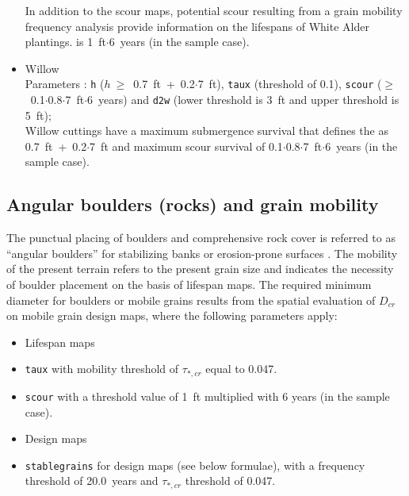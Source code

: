 \begin{itemize}
	In addition to the scour maps, potential scour resulting from a grain mobility frequency analysis provide information on the lifespans of White Alder plantings.  is 1~ft$\cdot$6~years (in the sample case).
	\item Willow\\
	Parameters \citep[extracted from][]{stromberg93, pasquale11, pasquale12, pasquale14}: \texttt{h} ($h~\geq $~0.7~ft~+~0.2$\cdot$7~ft), \texttt{taux} (threshold of 0.1), \texttt{scour} ($\geq$~0.1$\cdot$0.8$\cdot$7~ft$\cdot$6~years) and \texttt{d2w} (lower threshold is 3~ft and upper threshold is 5~ft);\\
	Willow cuttings have a maximum submergence survival that defines the  as 0.7~ft~+~0.2$\cdot$7~ft and maximum scour survival of 0.1$\cdot$0.8$\cdot$7~ft$\cdot$6~years (in the sample case).
\end{itemize}

\subsection{Angular boulders (rocks) and grain mobility}\label{sec:rocks}
The punctual placing of boulders and comprehensive rock cover is referred to as ``angular boulders'' for stabilizing banks or erosion-prone surfaces \citep[e.g.,][]{maynord08}. The mobility of the present terrain refers to the present grain size and indicates the necessity of boulder placement on the basis of lifespan maps. The required minimum diameter for boulders or mobile grains results from the spatial evaluation of $D_{cr}$ on mobile grain design maps, where the following parameters apply:
\begin{itemize}
	\item[] Lifespan maps
	\item \texttt{taux} with mobility threshold of $\tau_{*,cr}$ equal to 0.047.
	\item \texttt{scour} with a threshold value of 1~ft multiplied with 6 years (in the sample case).
	\item[] Design maps
	\item \texttt{stable{\myUnderscore}grains} for design maps (see below formulae), with a frequency threshold of 20.0~years and $\tau_{*,cr}$ threshold of 0.047.
\end{itemize}

